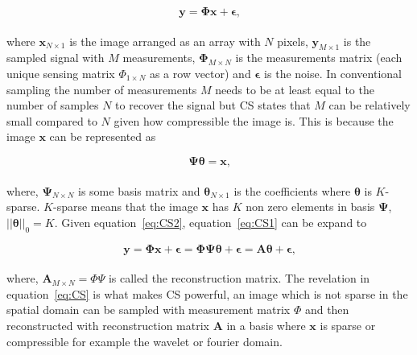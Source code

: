 \begin{equation}
\label{eq:CS1}
   \mathbf{ y = \Phi x + \epsilon}\text{,}
\end{equation}\\[0.1in]


where $\mathbf{x}_{N\times1}$ is the image arranged as an array with $N$ pixels, $\mathbf{y}_{M\times1}$ is the sampled signal with $M$ measurements, $\mathbf{\Phi}_{M \times N}$ is the measurements matrix (each unique sensing matrix $\Phi_{1 \times N}$ as a row vector) and $\mathbf{\epsilon}$ is the noise. In conventional sampling the number of measurements $M$ needs to be at least equal to the number of samples $N$ to recover the signal but CS states that $M$ can be relatively small compared to $N$ given how compressible the image is. This is because the image $\mathbf{x}$ can be represented as  

\begin{equation}
\label{eq:CS2}
   \mathbf{ \Psi \theta = x }\text{,}
\end{equation}\\[0.1in]

where, $\mathbf{\Psi}_{N \times N}$ is some basis matrix and
$\mathbf{\theta}_{N\times1}$ is the coefficients where $\mathbf{\theta}$ is $K$-sparse. $K$-sparse means that the image $\mathbf{x}$ has $K$ non zero elements in basis $\mathbf{\Psi}$, $||\mathbf{\theta}||_0 = K$. Given equation~\ref{eq:CS2}, equation~\ref{eq:CS1} can be expand to


\begin{equation}
   \mathbf{ y = \Phi x + \epsilon = \Phi \Psi \theta + \epsilon = A \theta + \epsilon }\text{,}
   \label{eq:CS}
\end{equation}\\[0.1in]

where, $\textbf{A}_{M \times N} = \Phi \Psi$ is called the reconstruction matrix. The revelation in equation~\ref{eq:CS}  is what makes CS powerful, an image which is not sparse in the spatial domain can be sampled with measurement matrix $\Phi$ and then reconstructed with reconstruction matrix $\textbf{A}$ in a basis where $\textbf{x}$ is sparse or compressible for example the wavelet or fourier domain. \cite{book:sm}


